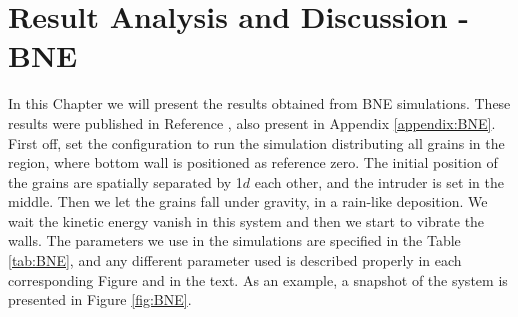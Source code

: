 
\chapter{Result Analysis and Discussion - BNE}
\label{chap:Resultados-BNE}
    In this Chapter we will present the results obtained from BNE simulations. These results were published in Reference \cite{Large-deviation_quantification_of_boundary_conditions_on_the_Brazil_nut_effect}, also present in Appendix \ref{appendix:BNE}. First off, set the configuration to run the simulation distributing all grains in the region, where bottom wall is positioned as reference zero. The initial position of the grains are spatially separated by 1$d$ each other, and the intruder is set in the middle. Then we let the grains fall under gravity, in a rain-like deposition. We wait the kinetic energy vanish in this system and then we start to vibrate the walls. The parameters we use in the simulations are specified in the Table \ref{tab:BNE}, and any different parameter used is described properly in each corresponding Figure and in the text. As an example, a snapshot of the system is presented in Figure \ref{fig:BNE}.




